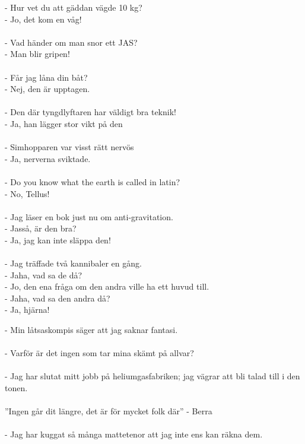 \documentclass{article}
\begin{document}
- Hur vet du att gäddan vägde 10 kg? \\
- Jo, det kom en våg!\\
\\
- Vad händer om man snor ett JAS? \\
- Man blir gripen!\\
\\
- Får jag låna din båt?\\
- Nej, den är upptagen. \\
\\
- Den där tyngdlyftaren har väldigt bra teknik! \\
- Ja, han lägger stor vikt på den \\
\\
- Simhopparen var visst rätt nervös \\
- Ja, nerverna sviktade. \\
\\
- Do you know what the earth is called in latin? \\
- No, Tellus! \\
\\
- Jag läser en bok just nu om anti-gravitation. \\
- Jasså, är den bra?\\
- Ja, jag kan inte släppa den! \\
\\
- Jag träffade två kannibaler en gång. \\
- Jaha, vad sa de då? \\
- Jo, den ena fråga om den andra ville ha ett huvud till.\\
- Jaha, vad sa den andra då?\\
- Ja, hjärna! \\

\clearpage

- Min låtsaskompis säger att jag saknar fantasi. \\
\\
- Varför är det ingen som tar mina skämt på allvar? \\
\\
- Jag har slutat mitt jobb på heliumgasfabriken; jag vägrar att bli
talad till i den tonen. \\
\\
''Ingen går dit längre, det är för mycket folk där'' - Berra \\
\\
- Jag har kuggat så många mattetenor att jag inte ens kan räkna dem. \\
\clearpage
\end{document}
